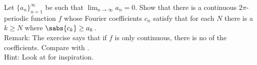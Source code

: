 \begin{exercise}
Let
$\{ a_n \}_{n=1}^\infty$ be such that 
$\lim_{n\to \infty} a_n = 0$.  Show that there is a continuous
$2\pi$-periodic function $f$ whose Fourier coefficients
$c_{n}$
satisfy that for each $N$ there is a $k \geq N$ where $\sabs{c_k} \geq
a_k$.\\
Remark: The exercise says that if $f$ is only continuous, there is
no  of the coefficients.  Compare with
.
\\
Hint: Look at  for inspiration.
\end{exercise}
